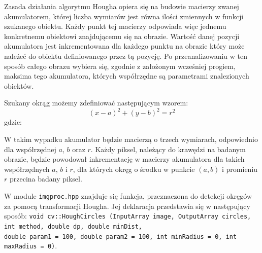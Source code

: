 Zasada działania algorytmu Hougha opiera się na budowie macierzy zwanej akumulatorem, której liczba wymiarów jest równa ilości zmiennych w funkcji szukanego obiektu. Każdy punkt tej macierzy odpowiada więc jednemu konkretnemu obiektowi znajdującemu się na obrazie. Wartość danej pozycji akumulatora jest inkrementowana dla każdego punktu na obrazie który może należeć do obiektu definiowanego przez tą pozycję. Po przeanalizowaniu w ten sposób całego obrazu wybiera się, zgodnie z założonym wcześniej progiem, maksima tego akumulatora, których współrzędne są parametrami znalezionych obiektów\cite{Sonka}.

Szukany okrąg możemy zdefiniować następującym wzorem:
\begin{equation}
(x - a)^2 + (y - b)^2 = r^2
\label{eq:kolo}
\end{equation}
gdzie:
\begin{equationDescriptor}
\end{equationDescriptor}
W takim wypadku akumulator będzie macierzą o trzech wymiarach, odpowiednio dla współrzędnej $a$, $b$ oraz $r$. Każdy piksel, należący do krawędzi na badanym obrazie, będzie powodował inkrementację w macierzy akumulatora dla takich współrzędnych $a$, $b$ i $r$, dla których okręg o środku w punkcie $(a, b)$ i promieniu $r$ przecina badany piksel.

W module \texttt{imgproc.hpp} znajduje się funkcja, przeznaczona do detekcji okręgów za pomocą transformacji Hougha. Jej deklaracja przedstawia się w następujący sposób: \texttt{void cv::HoughCircles (InputArray image, OutputArray circles, int method, double dp, double minDist, \\double param1 = 100, double param2 = 100, int minRadius = 0, int maxRadius = 0)}.

